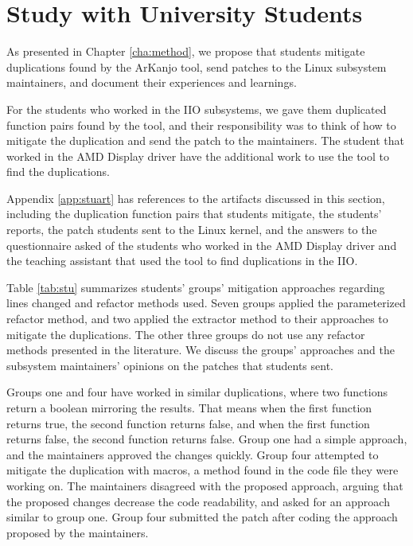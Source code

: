 \section{Study with University Students}

As presented in Chapter \ref{cha:method}, we propose that students mitigate duplications 
found by the ArKanjo tool, send patches to the Linux subsystem maintainers, and document 
their experiences and learnings.

For the students who worked in the IIO subsystems, we gave them duplicated function pairs 
found by the tool, and their responsibility was to think of how to mitigate the duplication 
and send the patch to the maintainers. The student that worked in the AMD Display driver 
have the additional work to use the tool to find the duplications.

Appendix \ref{app:stuart} has references to the artifacts discussed in this section, 
including the duplication function pairs that students mitigate, the students’ reports, 
the patch students sent to the Linux kernel, and the answers to the questionnaire asked 
of the students who worked in the AMD Display driver and the teaching assistant that used 
the tool to find duplications in the IIO.



Table \ref{tab:stu} summarizes students' groups' mitigation approaches regarding lines 
changed and refactor methods used. Seven groups applied the parameterized refactor method, 
and two applied the extractor method to their approaches to mitigate the duplications. 
The other three groups do not use any refactor methods presented in the literature. 
We discuss the groups' approaches and the subsystem maintainers' opinions on the patches 
that students sent.

Groups one and four have worked in similar duplications, where two functions return a 
boolean mirroring the results. That means when the first function returns true, the second 
function returns false, and when the first function returns false, the second function 
returns false. Group one had a simple approach, and the maintainers approved the changes quickly. 
Group four attempted to mitigate the duplication with macros, a method found in the code file 
they were working on. The maintainers disagreed with the proposed approach, arguing that the 
proposed changes decrease the code readability, and asked for an approach similar to group one. 
Group four submitted the patch after coding the approach proposed by the maintainers.

